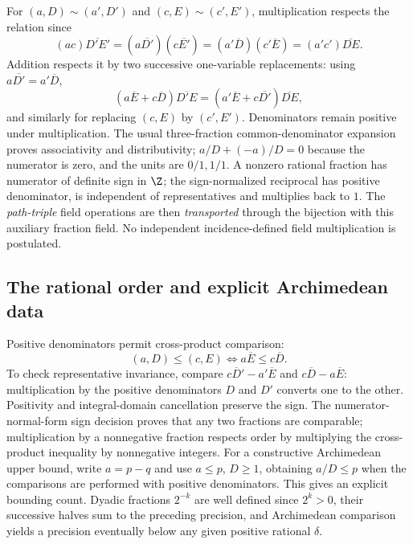 For $(a,D)\sim(a',D')$ and $(c,E)\sim(c',E')$, multiplication respects the relation since
\[(ac)\overline{D'E'}=(a\overline{D'})(c\overline{E'})=(a'\overline D)(c'\overline E)=(a'c')\overline{DE}.\]
Addition respects it by two successive one-variable replacements: using $a\overline{D'}=a'\overline D$,
\[(a\overline E+c\overline D)\overline{D'E}=(a'\overline E+c\overline{D'})\overline{DE},\]
and similarly for replacing $(c,E)$ by $(c',E')$. Denominators remain positive under multiplication. The usual three-fraction common-denominator expansion proves associativity and distributivity; $a/D+(-a)/D=0$ because the numerator is zero, and the units are $0/1,1/1$. A nonzero rational fraction has numerator of definite sign in $\Z$; the sign-normalized reciprocal has positive denominator, is independent of representatives and multiplies back to $1$. The \emph{path-triple} field operations are then \emph{transported} through the bijection with this auxiliary fraction field. No independent incidence-defined field multiplication is postulated.

\subsection{The rational order and explicit Archimedean data}\label{supp:6-5}
\par{}\par\smallskip

Positive denominators permit cross-product comparison:
\[(a,D)\le(c,E)\iff a\overline E\le c\overline D.\]
To check representative invariance, compare $c\overline D'-a'\overline E$ and $c\overline D-a\overline E$: multiplication by the positive denominators $D$ and $D'$ converts one to the other. Positivity and integral-domain cancellation preserve the sign. The numerator-normal-form sign decision proves that any two fractions are comparable; multiplication by a nonnegative fraction respects order by multiplying the cross-product inequality by nonnegative integers. For a constructive Archimedean upper bound, write $a=p-q$ and use $a\le p$, $D\ge1$, obtaining $a/D\le p$ when the comparisons are performed with positive denominators. This gives an explicit bounding count. Dyadic fractions $2^{-k}$ are well defined since $2^k>0$, their successive halves sum to the preceding precision, and Archimedean comparison yields a precision eventually below any given positive rational $\delta$.

